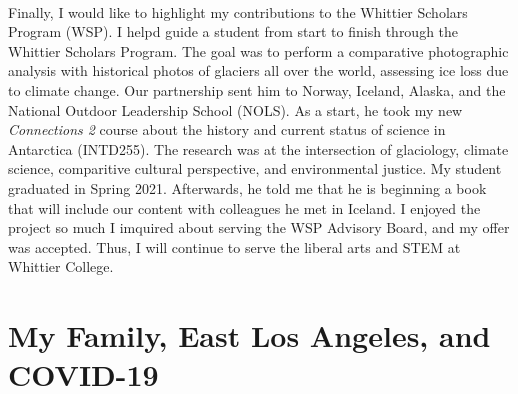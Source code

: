 \documentclass[../../main.tex]{subfiles}
\begin{document}
\\
\vspace{0.15cm}
Finally, I would like to highlight my contributions to the Whittier Scholars Program (WSP).  I helpd guide a student from start to finish through the Whittier Scholars Program.  The goal was to perform a comparative photographic analysis with historical photos of glaciers all over the world, assessing ice loss due to climate change.  Our partnership sent him to Norway, Iceland, Alaska, and the National Outdoor Leadership School (NOLS).  As a start, he took my new \textit{Connections 2} course about the history and current status of science in Antarctica (INTD255).  The research was at the intersection of glaciology, climate science, comparitive cultural perspective, and environmental justice.  My student graduated in Spring 2021.  Afterwards, he told me that he is beginning a book that will include our content with colleagues he met in Iceland.  I enjoyed the project so much I imquired about serving the WSP Advisory Board, and my offer was accepted.  Thus, I will continue to serve the liberal arts and STEM at Whittier College.

\section{My Family, East Los Angeles, and COVID-19}
\label{sec:family}
\end{document}
